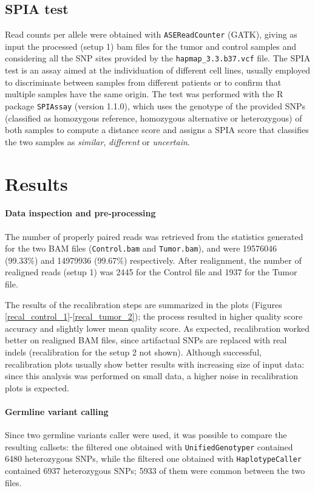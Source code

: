 \documentclass[11pt]{article}
\begin{document}
\subsection*{SPIA test}

Read counts per allele were obtained with \texttt{ASEReadCounter} (GATK), giving as input the processed (setup 1) bam files for the tumor and control samples and considering all the SNP sites provided by the \texttt{hapmap\_3.3.b37.vcf} file. The SPIA test is an assay aimed at the individuation of different cell lines, usually employed to discriminate between samples from different patients or to confirm that multiple samples have the same origin. The test was performed with the R package \texttt{SPIAssay} (version 1.1.0)\cite{spia}, which uses the genotype of the provided SNPs (classified as homozygous reference, homozygous alternative or heterozygous) of both samples to compute a distance score and assigns a SPIA score that classifies the two samples as \textit{similar}, \textit{different} or \textit{uncertain}.





\section*{Results}

\paragraph{Data inspection and pre-processing}
The number of properly paired reads was retrieved from the statistics generated for the two BAM files (\texttt{Control.bam} and \texttt{Tumor.bam}), and were 19576046 (99.33\%) and 14979936 (99.67\%) respectively. 
After realignment, the number of realigned reads (setup 1) was 2445 for the Control file and 1937 for the Tumor file. 

The results of the recalibration steps are summarized in the plots (Figures \ref{recal_control_1}-\ref{recal_tumor_2}); the process resulted in higher quality score accuracy and slightly lower mean quality score. As expected, recalibration worked better on realigned BAM files, since artifactual SNPs are replaced with real indels (recalibration for the setup 2 not shown). Although successful, recalibration plots usually show better results with increasing size of input data: since this analysis was performed on small data, a higher noise in recalibration plots is expected. 

\paragraph{Germline variant calling} 
Since two germline variants caller were used, it was possible to compare the resulting callsets: the filtered one obtained with \texttt{UnifiedGenotyper} contained 6480 heterozygous SNPs, while the filtered one obtained with \texttt{HaplotypeCaller} contained 6937 heterozygous SNPs; 5933 of them were common between the two files. 
\end{document}
